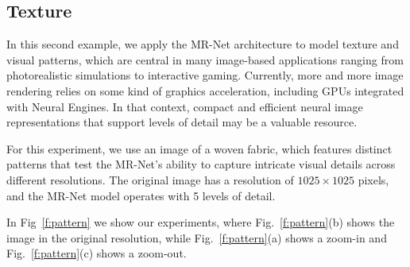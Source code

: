 \subsection{Texture}

In this second example, we apply the MR-Net architecture to model texture and visual patterns, which are central in many image-based applications ranging from photorealistic simulations to interactive gaming. Currently, more and more image rendering relies on some kind of graphics acceleration, including GPUs integrated with Neural Engines. In that context, compact and efficient neural image representations that support levels of detail may be a valuable resource.

For this experiment, we use an image of a woven fabric, which features distinct patterns that test the MR-Net's ability to capture intricate visual details across different resolutions. The original image has a resolution of \(1025 \times 1025\) pixels, and the MR-Net model operates with 5 levels of detail.


In Fig~\ref{f:pattern} we show our experiments, where Fig.~\ref{f:pattern}(b) shows the image in the original resolution, while Fig.~\ref{f:pattern}(a) shows a zoom-in and Fig.~\ref{f:pattern}(c) shows a zoom-out.

